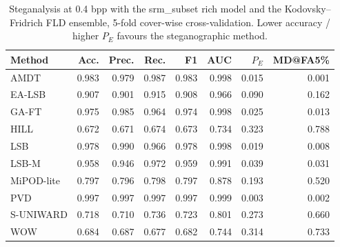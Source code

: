 \begin{table}[!t]
\centering
\caption{Steganalysis at 0.4 bpp with the srm_subset rich model and the Kodovsky--Fridrich FLD ensemble, 5-fold cover-wise cross-validation. Lower accuracy / higher $P_E$ favours the steganographic method.}
\label{tab:detection}
\footnotesize
\begin{tabular}{lrrrrrrr}
\toprule
Method & Acc. & Prec. & Rec. & F1 & AUC & $P_E$ & MD@FA5\% \\
\midrule
AMDT & 0.983 & 0.979 & 0.987 & 0.983 & 0.998 & 0.015 & 0.001 \\
EA-LSB & 0.907 & 0.901 & 0.915 & 0.908 & 0.966 & 0.090 & 0.162 \\
GA-FT & 0.975 & 0.985 & 0.964 & 0.974 & 0.998 & 0.025 & 0.013 \\
HILL & 0.672 & 0.671 & 0.674 & 0.673 & 0.734 & 0.323 & 0.788 \\
LSB & 0.978 & 0.990 & 0.966 & 0.978 & 0.998 & 0.019 & 0.008 \\
LSB-M & 0.958 & 0.946 & 0.972 & 0.959 & 0.991 & 0.039 & 0.031 \\
MiPOD-lite & 0.797 & 0.796 & 0.798 & 0.797 & 0.878 & 0.193 & 0.520 \\
PVD & 0.997 & 0.997 & 0.997 & 0.997 & 0.999 & 0.003 & 0.002 \\
S-UNIWARD & 0.718 & 0.710 & 0.736 & 0.723 & 0.801 & 0.273 & 0.660 \\
WOW & 0.684 & 0.687 & 0.677 & 0.682 & 0.744 & 0.314 & 0.733 \\
\bottomrule
\end{tabular}
\end{table}

